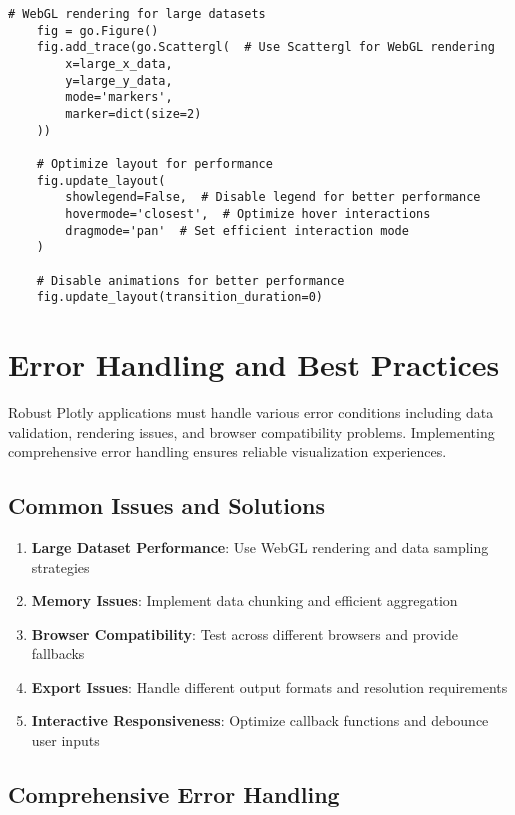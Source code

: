 \begin{lstlisting}[language=MyPython, caption={Rendering Optimization}, label={lst:rendering_optimization}]
	# WebGL rendering for large datasets
	fig = go.Figure()
	fig.add_trace(go.Scattergl(  # Use Scattergl for WebGL rendering
	    x=large_x_data,
	    y=large_y_data,
	    mode='markers',
	    marker=dict(size=2)
	))
	
	# Optimize layout for performance
	fig.update_layout(
	    showlegend=False,  # Disable legend for better performance
	    hovermode='closest',  # Optimize hover interactions
	    dragmode='pan'  # Set efficient interaction mode
	)
	
	# Disable animations for better performance
	fig.update_layout(transition_duration=0)
\end{lstlisting}

\section{Error Handling and Best Practices}
\label{sec:best_practices}

Robust Plotly applications must handle various error conditions including data validation, rendering issues, and browser compatibility problems. Implementing comprehensive error handling ensures reliable visualization experiences.

\subsection{Common Issues and Solutions}
\label{subsec:common_issues}

\begin{enumerate}
	\item \textbf{Large Dataset Performance}: Use WebGL rendering and data sampling strategies
	\item \textbf{Memory Issues}: Implement data chunking and efficient aggregation
	\item \textbf{Browser Compatibility}: Test across different browsers and provide fallbacks
	\item \textbf{Export Issues}: Handle different output formats and resolution requirements
	\item \textbf{Interactive Responsiveness}: Optimize callback functions and debounce user inputs
\end{enumerate}

\subsection{Comprehensive Error Handling}
\label{subsec:error_patterns}

